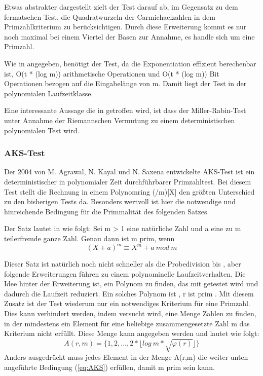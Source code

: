  		Etwas abstrakter dargestellt zielt der Test darauf ab, im Gegensatz zu dem fermatschen Test, die Quadratwurzeln der Carmichaelzahlen in dem Primzahlkriterium zu berücksichtigen. Durch diese Erweiterung kommt es nur noch maximal bei einem Viertel der Basen zur Annahme, es handle sich um eine Primzahl.
 		
 		Wie in \cite{Algebraische:und:zahlentheoretische:Grundlagen:fuer:die:Informatik} angegeben, benötigt der Test, da die Exponentiation effizient berechenbar ist, O(t * (log m)) arithmetische Operationen und O(t * (log m)) Bit Operationen bezogen auf die Eingabelänge von m. Damit liegt der Test in der polynomialen Laufzeitklasse.
 		
 		Eine interessante Aussage die in \cite{Algorithmische:Zahlentheorie} getroffen wird, ist dass der Miller-Rabin-Test unter Annahme der Riemannschen Vermutung zu einem deterministischen polynomialen Test wird.
 		


		\subsubsection{AKS-Test}
		Der 2004 von M. Agrawal, N. Kayal und N. Saxena entwickelte AKS-Test \cite{Primes:is:in:P} ist ein deterministischer in polynomialer Zeit durchführbarer Primzahltest. Bei diesem Test stellt die Rechnung in einem Polynomring (/m)[X] den größten Unterschied zu den bisherigen Tests da. Besonders wertvoll ist hier die notwendige und hinreichende Bedingung für die Primmalität des folgenden Satzes. 
		
		Der Satz lautet in \cite{Algorithmische:Zahlentheorie} wie folgt:
		Sei m > 1 eine natürliche Zahl und a eine zu m teilerfremde ganze
		Zahl. Genau dann ist m prim, wenn
		\begin{displaymath} 
			(X + a)^m \equiv X^m + a~mod~m
		\end{displaymath}
		
		Dieser Satz ist natürlich noch nicht schneller als die Probedivision bis , aber folgende Erweiterungen führen zu einem polynominelle Laufzeitverhalten. Die Idee hinter der Erweiterung ist, ein Polynom zu finden, das mit getestet wird und dadurch die Laufzeit reduziert. Ein solches Polynom ist , r ist prim . Mit diesem Zusatz ist der Test wiederum nur ein notwendiges Kriterium für eine Primzahl. Dies kann verhindert werden, indem versucht wird, eine Menge Zahlen zu finden, in der mindestens ein Element für eine beliebige zusammengesetzte Zahl m das Kriterium nicht erfüllt. Diese Menge kann angegeben werden und lautet wie folgt:
		\begin{displaymath}
			A(r,m) = \{1, 2, . . . , 2 * \lfloor log~m *\sqrt{\varphi(r)} \rfloor\}
		\end{displaymath}
		Anders ausgedrückt muss jedes Element in der Menge A(r,m) die weiter unten angeführte Bedingung (\ref{eq:AKS}) erfüllen, damit m prim sein kann.
		
